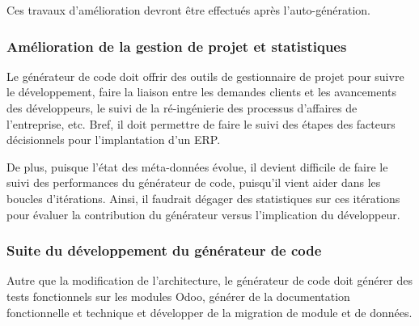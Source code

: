 



Ces travaux d’amélioration devront être effectués après l’auto-génération.

\subsubsection{Amélioration de la gestion de projet et statistiques}

Le générateur de code doit offrir des outils de gestionnaire de projet pour suivre le développement, faire la liaison entre les demandes clients et les avancements des développeurs, le suivi de la ré-ingénierie des processus d'affaires de l'entreprise, etc. Bref, il doit permettre de faire le suivi des étapes des facteurs décisionnels pour l'implantation d'un ERP.

De plus, puisque l’état des méta-données évolue, il devient difficile de faire le suivi des performances du générateur de code, puisqu’il vient aider dans les boucles d’itérations. Ainsi, il faudrait dégager des statistiques sur ces itérations pour évaluer la contribution du générateur versus l'implication du développeur.


\subsubsection{Suite du développement du générateur de code}

Autre que la modification de l'architecture, le générateur de code doit générer des tests fonctionnels sur les modules Odoo, générer de la documentation fonctionnelle et technique et développer de la migration de module et de données.


